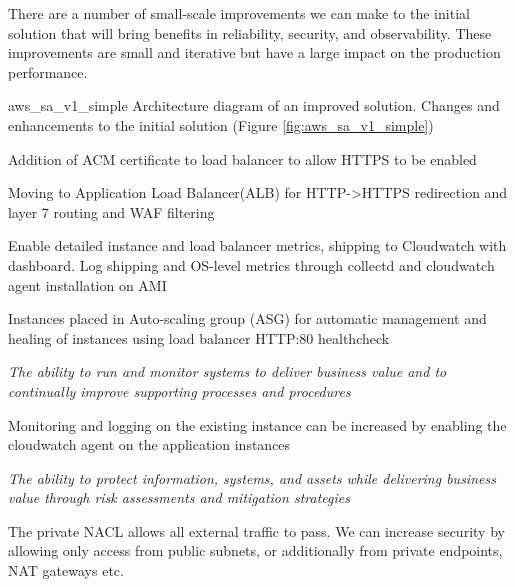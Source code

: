 
There are a number of small-scale improvements we can make to the initial solution that will bring benefits in reliability, security, and observability. These improvements are small and iterative but have a large impact on the production performance. 

\architecture
{aws_sa_v1_simple}
{Architecture diagram of an improved solution.}
\changes
{Changes and enhancements to the initial solution (Figure \ref{fig:aws_sa_v1_simple})}
{
	\item Addition of ACM certificate to load balancer to allow HTTPS to be enabled
	\item Moving to Application Load Balancer(ALB) for HTTP->HTTPS redirection and layer 7 routing and WAF filtering
	\item Enable detailed instance and load balancer metrics, shipping to Cloudwatch with dashboard. Log shipping and OS-level metrics through collectd and cloudwatch agent installation on AMI
\item Instances placed in Auto-scaling group (ASG) for automatic management and healing of instances using load balancer HTTP:80 healthcheck 
}

\FloatBarrier


\textit{The ability to run and monitor systems to deliver business value and to continually improve supporting processes and procedures}


Monitoring and logging on the existing instance can be increased by enabling the cloudwatch agent on the application instances



\textit{The ability to protect information, systems, and assets while delivering business value through risk assessments and mitigation strategies}





The private NACL allows all external traffic to pass. We can increase security by allowing only access from public subnets, or additionally from private endpoints, NAT gateways etc.

